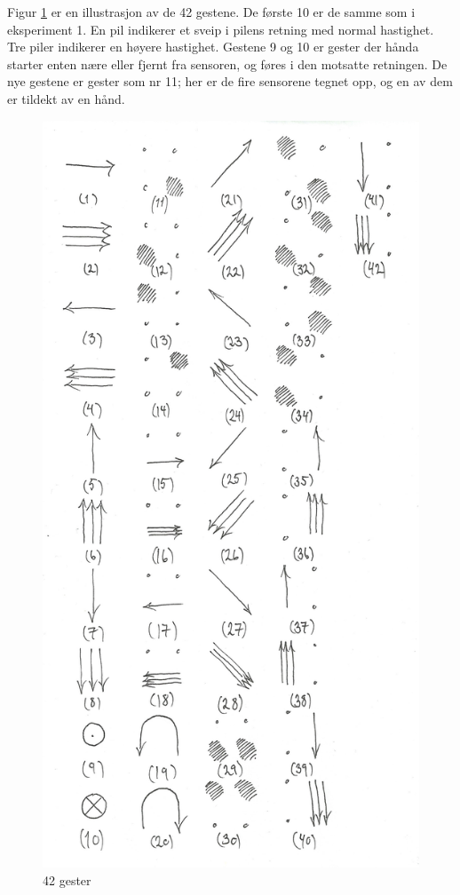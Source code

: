 Figur \ref{fig:42} er en illustrasjon av de 42 gestene. De første 10 er de samme som i eksperiment 1. En pil indikerer et sveip i pilens retning med normal hastighet. Tre piler indikerer en høyere hastighet. Gestene 9 og 10 er gester der hånda starter enten nære eller fjernt fra sensoren, og føres i den motsatte retningen. De nye gestene er gester som nr 11; her er de fire sensorene tegnet opp, og en av dem er tildekt av en hånd. 
\begin{figure}
\centering
\includegraphics[scale=0.2]{fig/42-gestures}
\caption{42 gester}
\label{fig:42}
\end{figure}

